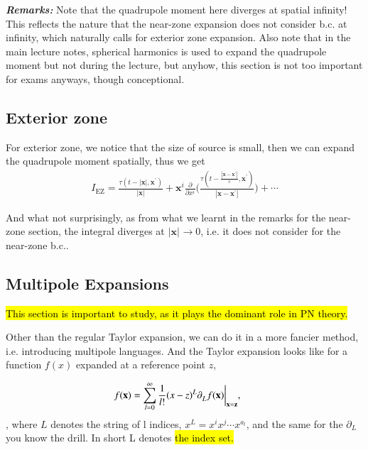 \documentclass[a4paper, 12pt]{article}
\begin{document}
  \textbf{\textit{Remarks: }} Note that the quadrupole moment here
  diverges at spatial infinity! This reflects the nature that the near-zone
  expansion does not consider b.c. at infinity, which naturally calls for
  exterior zone expansion. Also note that in the main lecture notes,
  spherical harmonics is used to expand the quadrupole moment but not during
  the lecture, but anyhow, this section is not too important for exams
  anyways, though conceptional.

  \subsection{Exterior zone}%
    \label{sub:Exterior zone}
  
  For exterior zone, we notice that the size of source is small, then we
  can expand the quadrupole moment spatially, thus we get 
  \begin{align}
    \label{spatial exterior expansion}
    I_{\mathrm{EZ}} = \frac{\tau ( t - | \textbf{x} |,
    \textbf{x}^{\prime}  )}{ | \textbf{x} |^{}  } +
    \textbf{x}^{i} \frac{\partial  }{\partial x^{i} } \bigg(
    \frac{\tau ( t - \frac{| \textbf{x} - \textbf{x}^{\prime} |^{}
    }{c}, \textbf{x}^{\prime})}{| \textbf{x} -
    \textbf{x}^{\prime} |^{} } \bigg) +
    \cdots
  \end{align}

  And what not surprisingly, as from what we learnt in the remarks
  for the near-zone section, the integral diverges at \( | \textbf{x} |^{}
  \to 0 \), i.e. it does not consider for the near-zone b.c..

\subsection{Multipole Expansions}%
  \label{sub:Multipole Expansions}

  \hl{This section is important to study, as it plays the dominant
  role in PN theory.}  

  Other than the regular Taylor expansion, we can do it in a more fancier
  method, i.e. introducing multipole languages. And the Taylor expansion
  looks like for a function \( f(x) \) expanded at a reference point \( z \), 

  \begin{align}
    \label{taylor multipole expansion}
    f(\textbf{x}) = \sum_{l = 0}^{\infty} \frac{1}{l!} (x-z)^L
    \partial_{L}^{} f(\textbf{x}) \bigg|_{\textbf{x} = \textbf{z}},
    \hspace{0.5cm} 
  \end{align}, where \( L \) denotes the string of l indices, 
  \( x^L = x^i x^j \cdots x^{a_l} \), and the same for the \(
  \partial_{L}^{} \) you know the drill. In short L denotes \hl{the
  index set.}   
 
\end{document}
